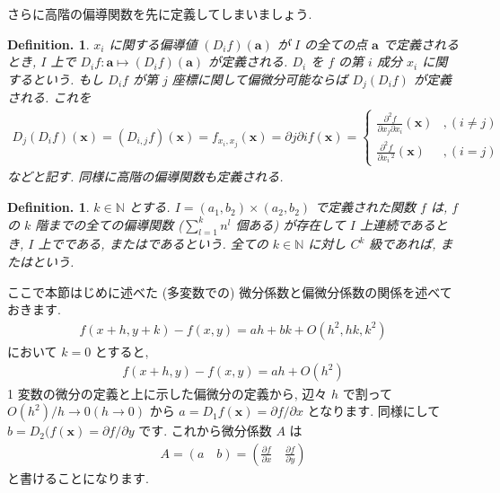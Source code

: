 \documentclass[openany, a4paper, oneside]{book}
\theoremstyle{break}
\theoremstyle{breakdefn}
\newtheorem{defn}[thm]{Definition.}
\newcommand{\bN}{\mathbb{N}}
\begin{document}
さらに高階の偏導関数を先に定義してしまいましょう.
\begin{defn}
 $x_i$ に関する偏導値 $(D_if) (\bm{a})$ が $I$ の全ての点 $\bm{a}$ で定義されるとき,
 $I$ 上で $D_if:\bm{a}\mapsto (D_if) (\bm{a})$ が定義される.
 $D_i$ を $f$ の第 $i$ 成分 $x_i$ に関するという.
もし $D_if$ が第 $j$ 座標に関して偏微分可能ならば $D_j (D_if)$ が定義される. これを
    \begin{align}
        D_j (D_if) (\bm{x})
        =
        (D_{i,j}f) (\bm{x})
        =
        f_{x_i,x_j}(\bm{x})
        =
        \partial j \partial i f (\bm{x})
        =
        \begin{cases}
            \frac{\partial ^2 f}{\partial x_j \partial x_i}(\bm{x})&,(i\not= j)\\
            \frac{\partial ^2 f} {\partial x_i\,^2}(\bm{x})&,(i=j)
        \end{cases}
    \end{align}
などと記す. 同様に高階の偏導関数も定義される.
\end{defn}
\begin{defn}
 $k\in\bN$ とする.  $I=(a_1,b_2)\times (a_2,b_2)$ で定義された関数 $f$ は,  $f$ の $k$ 階までの全ての偏導関数
($\sum_{l=1}^k n^l$ 個ある) が存在して $I$ 上連続であるとき,  $I$ 上でである,
またはであるという.
全ての $k\in\bN$ に対し $C^k$ 級であれば, またはという.
\end{defn}

ここで本節はじめに述べた (多変数での) 微分係数と偏微分係数の関係を述べておきます.
    \begin{align}
        f (x+h,y+k)-f (x,y)
        =
        ah + bk + O (h^2,hk,k^2)
    \end{align}
において $k=0$ とすると,
    \begin{align}
        f (x+h,y)-f (x,y)
        =
        ah + O (h^2)
    \end{align}
1 変数の微分の定義と上に示した偏微分の定義から, 辺々 $h$ で割って $O (h^2)/h\to0 (h\to0)$ から
 $a=D_1f (\bm{x})=\partial f/\partial x$ となります.
同様にして $b=D_2 (f (\bm{x})=\partial f/\partial y$ です.
これから微分係数 $A$ は
    \begin{align}
        A
        =
        (a \quad b)
        =
        \left ( \frac{\partial f} {\partial x} \quad \frac{\partial f} {\partial y} \right)
    \end{align}
と書けることになります.
\end{document}
